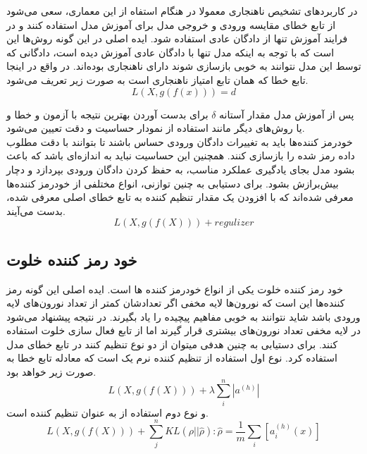 \documentclass[12pt,a4paper]{report}
\theoremstyle{definition}
\theoremstyle{definition}
\begin{document}
در کاربردهای تشخیص ناهنجاری معمولا در هنگام استفاه از این معماری، سعی می‌شود از تابع خطای مقایسه ورودی و خروجی مدل برای آموزش مدل استفاده کنند و در فرایند آموزش تنها از دادگان عادی استفاده شود. ایده اصلی در این گونه روش‌ها این است که با توجه به اینکه مدل تنها با دادگان عادی آموزش دیده است، دادگانی که توسط این مدل نتوانند به خوبی بازسازی شوند دارای ناهنجاری بوده‌اند. در واقع در اینجا تابع خطا که همان تابع امتیاز ناهنجاری است به صورت زیر تعریف می‌شود.
\begin{equation}
	L(X, g(f(x))) = d
\end{equation}

پس از آموزش مدل مقدار آستانه $\delta$ برای بدست آوردن بهترین نتیجه با آزمون و خطا و یا روش‌های دیگر مانند استفاده از نمودار حساسیت و دقت تعیین می‌شود. \\

خودرمز کننده‌ها باید به تغییرات دادگان ورودی حساس باشند تا بتوانند با دقت مطلوب داده رمز شده را بازسازی کنند. همچنین این حساسیت نباید به اندازه‌ای باشد که باعث بشود مدل بجای یادگیری عملکرد مناسب، به حفظ کردن دادگان ورودی بپردازد و دچار بیش‌برازش بشود. برای دستیابی به چنین توازنی، انواع مختلفی از خودرمز کننده‌ها معرفی شده‌اند که با افزودن یک مقدار تنظیم کننده به تابع خطای اصلی معرفی شده، بدست می‌آیند.
\begin{equation}
	L(X, g(f(X))) + regulizer
\end{equation}

\subsection{خود رمز کننده خلوت}
خود رمز کننده خلوت یکی از انواع خودرمز کننده ها است. ایده اصلی این گونه رمز کننده‌ها این است که نورون‌ها لایه مخفی اگر تعدادشان کمتر از تعداد نورون‌های لایه ورودی باشد شاید نتوانند به خوبی مفاهیم پیچیده را یاد بگیرند. در نتیجه پیشنهاد می‌شود در لایه مخفی تعداد نورون‌های بیشتری قرار گیرند اما از تابع فعال سازی خلوت استفاده کنند. برای دستیابی به چنین هدفی میتوان از دو نوع تنظیم کنند در تابع خطای مدل استفاده کرد. نوع اول استفاده از تنظیم کننده نرم یک است که معادله تابع خطا به صورت زیر خواهد بود.
\begin{equation}
L(X, g(f(X))) + \lambda \sum_{i}^{n}|a^{(h)}|
\end{equation}
و نوع دوم استفاده از  به عنوان تنظیم کننده است.
\begin{equation}
L(X, g(f(X))) + \sum_{j}^{n}KL(\rho || \hat{\rho}): \hat{\rho} =  \frac{1}{m}\sum_{i}[a_i^{(h)}(x)]
\end{equation}
\end{document}
